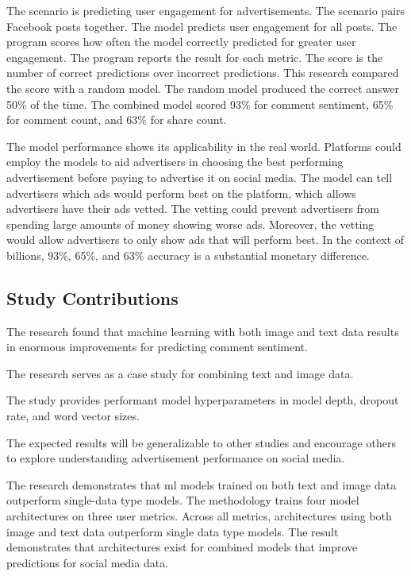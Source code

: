 \documentclass[mksc,blindrev]{informs3} %
\begin{document}
The scenario is predicting user engagement for advertisements. The scenario pairs Facebook posts together. The model predicts user engagement for all posts. The program scores how often the model correctly predicted for greater user engagement. The program reports the result for each metric. The score is the number of correct predictions over incorrect predictions. This research compared the score with a random model. The random model produced the correct answer 50\% of the time. The combined model scored 93\% for comment sentiment, 65\% for comment count, and 63\% for share count.

The model performance shows its applicability in the real world.  Platforms could employ the models to aid advertisers in choosing the best performing advertisement before paying to advertise it on social media. The model can tell advertisers which ads would perform best on the platform, which allows advertisers have their ads vetted. The vetting could prevent advertisers from spending large amounts of money showing worse ads. Moreover, the vetting would allow advertisers to only show ads that will perform best. In the context of billions, 93\%, 65\%, and 63\% accuracy is a substantial monetary difference.

\subsection{Study Contributions}

The research found that machine learning with both image and text data results in enormous improvements for predicting comment sentiment.

The research serves as a case study for combining text and image data.

The study provides performant model hyperparameters in model depth, dropout rate, and word vector sizes.

The expected results will be generalizable to other studies and encourage others to explore understanding advertisement performance on social media.


The research demonstrates that ml models trained on both text and image data outperform single-data type models. The methodology trains four model architectures on three user metrics.  Across all metrics, architectures using both image and text data outperform single data type models. The result demonstrates that architectures exist for combined models that improve predictions for social media data.
\end{document}
